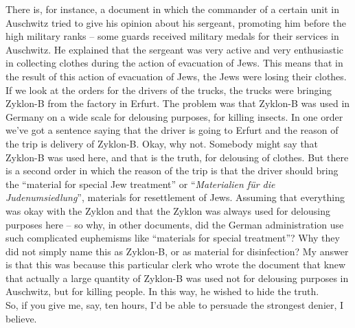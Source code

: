 There is, for instance, a document in which the commander of a certain unit in Auschwitz tried to give his opinion about his sergeant, promoting him before the high military ranks – some guards received military medals for their services in Auschwitz. He explained that the sergeant was very active and very enthusiastic in collecting clothes during the action of evacuation of Jews. This means that in the result of this action of evacuation of Jews, the Jews were losing their clothes. If we look at the orders for the drivers of the trucks, the trucks were bringing Zyklon-B from the factory in Erfurt. The problem was that Zyklon-B was used in Germany on a wide scale for delousing purposes, for killing insects. In one order we’ve got a sentence saying that the driver is going to Erfurt and the reason of the trip is delivery of Zyklon-B. Okay, why not. Somebody might say that Zyklon-B was used here, and that is the truth, for delousing of clothes. But there is a second order in which the reason of the trip is that the driver should bring the ``material for special Jew treatment'' or ``\textit{Materialien für die Judenumsiedlung}'', materials for resettlement of Jews. Assuming that everything was okay with the Zyklon and that the Zyklon was always used for delousing purposes here – so why, in other documents, did the German administration use such complicated euphemisms like ``materials for special treatment''? Why they did not simply name this as Zyklon-B, or as material for disinfection? My answer is that this was because this particular clerk who wrote the document that knew that actually a large quantity of Zyklon-B was used not for delousing purposes in Auschwitz, but for killing people. In this way, he wished to hide the truth. \\
So, if you give me, say, ten hours, I’d be able to persuade the strongest denier, I believe.